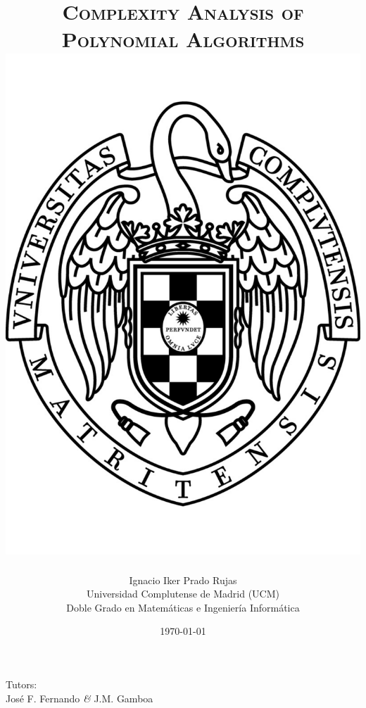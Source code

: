 \documentclass[11pt, a4paper, english, twoside, notitlepage]{report}
\begin{document}
\begin{titlepage}

\title{\huge{\textsc{Complexity Analysis of Polynomial Algorithms}} \\
	\protect\includegraphics[scale=0.2]{ucm.pdf}}
\author{Ignacio Iker Prado Rujas \\
	Universidad Complutense de Madrid (UCM) \\
	Doble Grado en Matem\'aticas e Ingenier\'ia Inform\'atica}
\date{\today}
\maketitle
\thispagestyle{empty}

\begin{center}
	Tutors: \\
	Jos\'e F. Fernando \textit{\&} J.M. Gamboa \\
	\
\end{center}
	

\end{titlepage}
\end{document}
